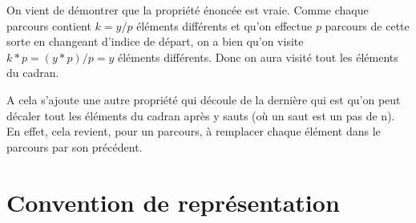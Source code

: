 \documentclass[a4paper, 12pt]{report}
\begin{document}
On vient de démontrer que la propriété énoncée est vraie. Comme chaque parcours contient $k = y/p$ éléments différents et qu'on effectue $p$ parcours de cette sorte en changeant d'indice de départ, on a bien qu'on visite $k*p = (y*p)/p = y $ éléments différents. Donc on aura visité tout les éléments du cadran. \newline

A cela s'ajoute une autre propriété qui découle de la dernière qui est qu'on peut décaler tout les éléments du cadran après y sauts (où un saut est un pas de n). En effet, cela revient, pour un parcours, à remplacer chaque élément dans le parcours par son précédent.

\section{Convention de représentation}
\end{document}
